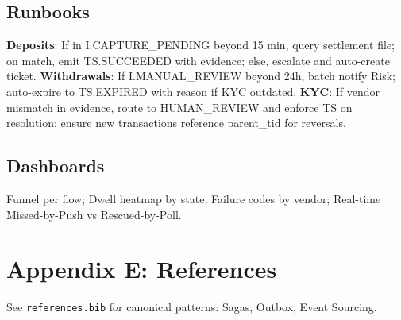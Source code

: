 \documentclass[11pt]{article}
\begin{document}
\subsection*{Runbooks}
\textbf{Deposits}: If in I.CAPTURE\_PENDING beyond 15 min, query settlement file; on match, emit TS.SUCCEEDED with evidence; else, escalate and auto-create ticket.
\newline
\textbf{Withdrawals}: If I.MANUAL\_REVIEW beyond 24h, batch notify Risk; auto-expire to TS.EXPIRED with reason if KYC outdated.
\newline
\textbf{KYC}: If vendor mismatch in evidence, route to HUMAN\_REVIEW and enforce TS on resolution; ensure new transactions reference parent\_tid for reversals.

\subsection*{Dashboards}
Funnel per flow; Dwell heatmap by state; Failure codes by vendor; Real-time Missed-by-Push vs Rescued-by-Poll.

\section{Appendix E: References}
{\small See \texttt{references.bib} for canonical patterns: Sagas, Outbox, Event Sourcing.}
\end{document}
